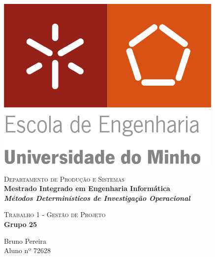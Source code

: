 \begin{titlepage}


\begin{minipage}{0.3\textwidth}
\begin{flushleft} 
\includegraphics[width=\textwidth]{./logo.png}
\end{flushleft}
\end{minipage}
\begin{minipage}{0.6\textwidth}
\begin{flushright} 

\textsc{Departamento de Produção e Sistemas}\\[0.1cm]
\bfseries Mestrado Integrado em Engenharia Informática \\ [0.1cm]
\bfseries \textit{Métodos Determinísticos de Investigação Operacional}\\[8mm]

\end{flushright}
\end{minipage}


\vspace{3cm}


\begin{center}



\textsc{\LARGE Trabalho 1 - Gestão de Projeto}\\[1.5cm]


{\Large \bfseries Grupo 25\\[2cm] }


\begin{minipage}{0.4\textwidth}
	\begin{flushleft} 
		\large Bruno Pereira\\
           Aluno nº 72628 
	\end{flushleft}


\end{minipage}
\end{center}
\end{titlepage}
